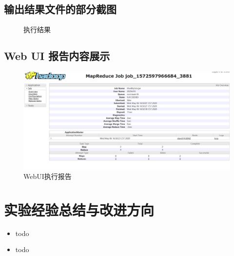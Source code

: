 \documentclass[a4paper,UTF8]{article}
\numberwithin{equation}{section}
\begin{document}
\subsection{输出结果文件的部分截图}
\begin{figure}[H]
	\centering
	\vfill
	
	\caption{执行结果}
\end{figure}

\subsection{Web UI 报告内容展示}
\begin{figure}[H]
	\centering
	\includegraphics[width = 15cm]{job.PNG}
	\caption{WebUI执行报告}
\end{figure}
\section{实验经验总结与改进方向}
\begin{itemize}
	\item todo
	\item todo
\end{itemize}



\end{document}
